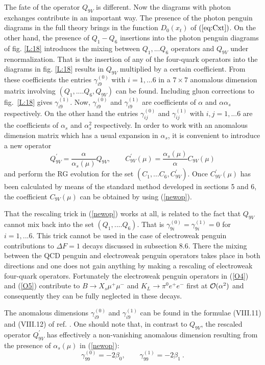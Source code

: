 \documentclass[12pt,rotate]{article}
\newcommand{\be}{\begin{equation}}
\newcommand{\ee}{\end{equation}}
\newcommand{\ord}{{\cal O}}
\begin{document}
\begin{itemize}
\begin{itemize}
The fate of the operator $Q_{9V}$ is different. Now the diagrams with
photon exchanges contribute in an important way. The presence of the 
photon penguin diagrams in the full theory brings in the function
$D_0(x_t)$ of $(\ref{eq:Cxt})$. On the other hand, the presence of
$Q_1-Q_6$ insertions into the photon penguin diagrams of fig. 
\ref{L:18}
introduces the mixing between $Q_1,...Q_6$ operators and $Q_{9V}$
under renormalization. That is the insertion of any of the four-quark 
operators into the diagrams in fig. \ref{L:18} results in 
$Q_{9V}$ multiplied
by a certain coefficient. From these coefficients the entries
$\gamma^{(0)}_{i9}$ with $i=1,...6$ in
a $7\times 7$ anomalous dimension matrix involving 
$(Q_1,....Q_6,Q_{9V})$ can be found. 
Including gluon corrections to fig.~\ref{L:18} gives
$\gamma^{(1)}_{i9}$.
Now, 
$\gamma^{(0)}_{i9}$ and $\gamma^{(1)}_{i9}$ are coefficients of
$\alpha$ and $\alpha\alpha_s$ respectively. On the other hand
the entries $\gamma^{(0)}_{ij}$ and $\gamma^{(1)}_{ij}$ with
$i,j=1,...6$ are the coefficients of $\alpha_s$ and $\alpha_s^2$
respectively. In order to work with an anomalous dimension
matrix which has a usual expansion in $\alpha_s$, it is convenient
to introduce a new operator
\be\label{newop}
Q^\prime_{9V}=\frac{\alpha}{\alpha_s(\mu)} Q_{9V},
\quad\quad
C^\prime_{9V}(\mu)=\frac{\alpha_s(\mu)}{\alpha} C_{9V}(\mu)
\ee
and perform the RG evolution for the set $(C_1,...C_6,C^\prime_{9V})$.
Once $C^\prime_{9V}(\mu)$ has been calculated by means of the standard
method developed in sections 5 and 6, the coefficient $C_{9V}(\mu)$
can be obtained by using (\ref{newop}).

That the rescaling trick in (\ref{newop}) works at all, is related to
the fact that $Q_{9V}$ cannot mix back into the set $(Q_1,....Q_6)$.
That is $\gamma^{(0)}_{9i}=\gamma^{(1)}_{9i}=0$ for $i=1,...6.$
This trick cannot be used in the case of electroweak penguin contributions
to $\Delta F=1$ decays discussed in subsection 8.6. 
There the mixing between
the QCD penguin and electroweak penguin operators takes place in both
directions and one does not gain anything by making a rescaling of
electroweak four-quark operators. Fortunately the electroweak penguin
operators in (\ref{O4}) and (\ref{O5}) contribute to
$B \to X_s \mu^+\mu^-$ and $K_L\to \pi^0 e^+e^-$ first at $\ord(\alpha^2)$
and consequently they can be fully neglected in these decays.

The anomalous dimensions $\gamma^{(0)}_{i9}$ and $\gamma^{(1)}_{i9}$
can be found in the formulae (VIII.11) and (VIII.12) of ref. 
\cite{BBL}. One
should note that, in contrast to $Q_{9V}$, the rescaled operator
$Q^\prime_{9V}$ has effectively a non-vanishing anomalous dimension resulting
from the presence of $\alpha_s(\mu)$ in (\ref{newop}):
\be
\gamma^{(0)}_{99}=-2\beta_0, \quad\quad \gamma^{(1)}_{99}=-2 \beta_1~.
\ee


\end{itemize}
\end{itemize}
\end{document}
